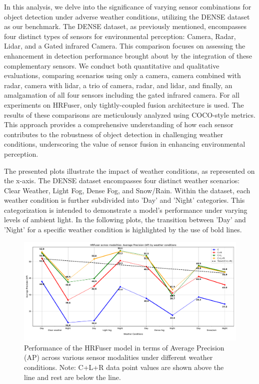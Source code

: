 \documentclass[report.tex]{subfiles}
\begin{document}
    In this analysis, we delve into the significance of varying sensor combinations for object detection under adverse weather conditions, utilizing the DENSE dataset as our benchmark. The DENSE dataset, as previously mentioned, encompasses four distinct types of sensors for environmental perception: Camera, Radar, Lidar, and a Gated infrared Camera. This comparison focuses on assessing the enhancement in detection performance brought about by the integration of these complementary sensors. We conduct both quantitative and qualitative evaluations, comparing scenarios using only a camera, camera combined with radar, camera with lidar, a trio of camera, radar, and lidar, and finally, an amalgamation of all four sensors including the gated infrared camera. For all experiments on HRFuser, only tightly-coupled fusion architecture is used. The results of these comparisons are meticulously analyzed using COCO-style metrics. This approach provides a comprehensive understanding of how each sensor contributes to the robustness of object detection in challenging weather conditions, underscoring the value of sensor fusion in enhancing environmental perception.

    The presented plots illustrate the impact of weather conditions, as represented on the x-axis. The DENSE dataset encompasses four distinct weather scenarios: Clear Weather, Light Fog, Dense Fog, and Snow/Rain. Within the dataset, each weather condition is further subdivided into 'Day' and 'Night' categories. This categorization is intended to demonstrate a model's performance under varying levels of ambient light. In the following plots, the transition between 'Day' and 'Night' for a specific weather condition is highlighted by the use of bold lines.

    \begin{figure}[h!]
        \centering
        \includegraphics[width=1.0\textwidth]{images/results/hrfuser/ap.pdf}
        \caption{Performance of the HRFuser model in terms of Average Precision (AP) across various sensor modalities under different weather conditions. Note: C+L+R data point values are shown above the line and rest are below the line.}
        \label{fig:hrfuser_ap}
    \end{figure}
\end{document}
